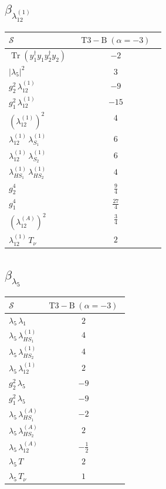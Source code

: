 \documentclass[9pt]{article}
\begin{document}
\subsection*{$ \beta_{\lambda_{12}^{(1)}} $}
\begin{longtable}{@{}p{0.31\linewidth}c@{}}
\toprule
$\mathcal{S}$ & $ \mathrm{T3-B}\;(\alpha=-3) $ \\
\midrule
$ \operatorname{Tr}(y_1^\dagger y_1y_2^\dagger y_2) $ & $ -2 $ \\
$ |\lambda_5|^2 $ & $ 3 $ \\
$ g_2^2\,\lambda_{12}^{(1)} $ & $ -9 $ \\
$ g_1^2\,\lambda_{12}^{(1)} $ & $ -15 $ \\
$ \left(\lambda_{12}^{(1)}\right)^2 $ & $ 4 $ \\
$ \lambda_{12}^{(1)}\,\lambda_{S_1}^{(1)} $ & $ 6 $ \\
$ \lambda_{12}^{(1)}\,\lambda_{S_2}^{(1)} $ & $ 6 $ \\
$ \lambda_{HS_1}^{(1)}\,\lambda_{HS_2}^{(1)} $ & $ 4 $ \\
$ g_2^4 $ & $ \frac{9}{4} $ \\
$ g_1^4 $ & $ \frac{27}{4} $ \\
$ \left(\lambda_{12}^{(A)}\right)^2 $ & $ \frac{3}{4} $ \\
$ \lambda_{12}^{(1)}\,T_\nu $ & $ 2 $ \\
\bottomrule
\end{longtable}
\subsection*{$ \beta_{\lambda_5} $}
\begin{longtable}{@{}p{0.31\linewidth}c@{}}
\toprule
$\mathcal{S}$ & $ \mathrm{T3-B}\;(\alpha=-3) $ \\
\midrule
$ \lambda_5\,\lambda_1 $ & $ 2 $ \\
$ \lambda_5\,\lambda_{HS_1}^{(1)} $ & $ 4 $ \\
$ \lambda_5\,\lambda_{HS_2}^{(1)} $ & $ 4 $ \\
$ \lambda_5\,\lambda_{12}^{(1)} $ & $ 2 $ \\
$ g_2^2\,\lambda_5 $ & $ -9 $ \\
$ g_1^2\,\lambda_5 $ & $ -9 $ \\
$ \lambda_5\,\lambda_{HS_1}^{(A)} $ & $ -2 $ \\
$ \lambda_5\,\lambda_{HS_2}^{(A)} $ & $ 2 $ \\
$ \lambda_5\,\lambda_{12}^{(A)} $ & $ - \frac{1}{2} $ \\
$ \lambda_5\,T $ & $ 2 $ \\
$ \lambda_5\,T_\nu $ & $ 1 $ \\
\bottomrule
\end{longtable}
\end{document}

